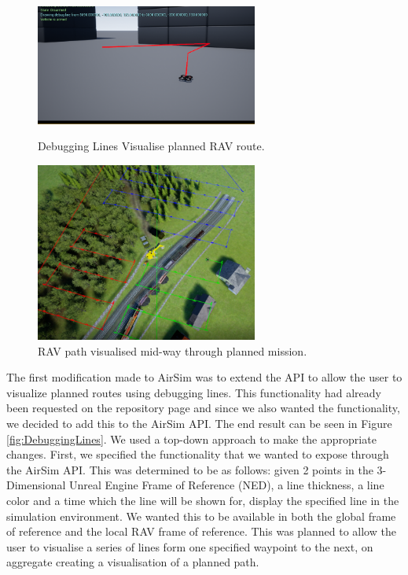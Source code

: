 \begin{figure}
    \centering
    \includegraphics[width=0.65\textwidth]{Chapters/SimulationEnv/Figs/DebuggingLines/DebugLines.png}
    \caption{Debugging Lines Visualise planned RAV route.}
    \label{fig:DebuggingLines}

    \centering
    \includegraphics[width=0.65\textwidth]{Chapters/SimulationEnv/Figs/DebuggingLines/RoutesWithRAVsVisible.png}
    \caption{RAV path visualised mid-way through planned mission.}
    \label{fig:DebuggingLinesPlannedMission}
\end{figure}
The first modification made to AirSim was to extend the API to allow the user to visualize planned routes using debugging lines. This functionality had already been requested on the repository page and since we also wanted the functionality, we decided to add this to the AirSim API. The end result can be seen in Figure \ref{fig:DebuggingLines}. We used a top-down approach to make the appropriate changes. First, we specified the functionality that we wanted to expose through the AirSim API. This was determined to be as follows: given 2 points in the 3-Dimensional Unreal Engine Frame of Reference (NED), a line thickness, a line color and a time which the line will be shown for, display the specified line in the simulation environment. We wanted this to be available in both the global frame of reference and the local RAV frame of reference. This was planned to allow the user to visualise a series of lines form one specified waypoint to the next, on aggregate creating a visualisation of a planned path.
\newline


